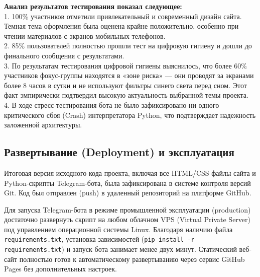 \textbf{Анализ результатов тестирования показал следующее:}\\
1. 100\% участников отметили привлекательный и современный дизайн сайта. Темная тема оформления была оценена крайне положительно, особенно при чтении материалов с экранов мобильных телефонов.\\
2. 85\% пользователей полностью прошли тест на цифровую гигиену и дошли до финального сообщения с результатами.\\
3. По результатам тестирования цифровой гигиены выяснилось, что более 60\% участников фокус-группы находятся в «зоне риска» — они проводят за экранами более 8 часов в сутки и не используют фильтры синего света перед сном. Этот факт эмпирически подтвердил высокую актуальность выбранной темы проекта.\\
4. В ходе стресс-тестирования бота не было зафиксировано ни одного критического сбоя (Crash) интерпретатора Python, что подтверждает надежность заложенной архитектуры.

\subsection{Развертывание (Deployment) и эксплуатация}
Итоговая версия исходного кода проекта, включая все HTML/CSS файлы сайта и Python-скрипты Telegram-бота, была зафиксирована в системе контроля версий Git. Код был отправлен (push) в удаленный репозиторий на платформе GitHub.

Для запуска Telegram-бота в режиме промышленной эксплуатации (production) достаточно развернуть скрипт на любом облачном VPS (Virtual Private Server) под управлением операционной системы Linux. Благодаря наличию файла \texttt{requirements.txt}, установка зависимостей (\texttt{pip install -r requirements.txt}) и запуск бота занимает менее двух минут. Статический веб-сайт полностью готов к автоматическому развертыванию через сервис GitHub Pages без дополнительных настроек.
